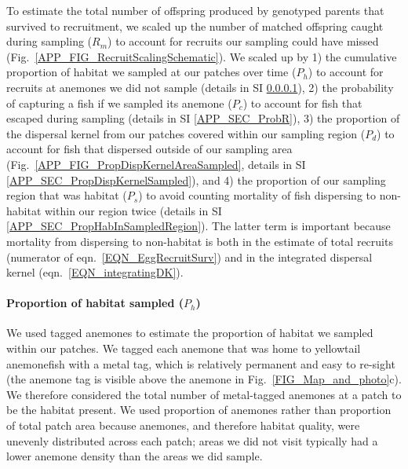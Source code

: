 \documentclass[12pt, oneside]{article}   	%
\begin{document}
To estimate the total number of offspring produced by genotyped parents that survived to recruitment, we scaled up the number of matched offspring caught during sampling ($R_m$) to account for recruits our sampling could have missed (Fig.\ \ref{APP_FIG_RecruitScalingSchematic}). We scaled up by 1) the cumulative proportion of habitat we sampled at our patches over time ($P_h$) to account for recruits at anemones we did not sample (details in SI \ref{APP_SEC_ProbHabSampled}), 2) the probability of capturing a fish if we sampled its anemone ($P_c$) to account for fish that escaped during sampling (details in SI \ref{APP_SEC_ProbR}), 3) the proportion of the dispersal kernel from our patches covered within our sampling region ($P_d$) to account for fish that dispersed outside of our sampling area (Fig.\ \ref{APP_FIG_PropDispKernelAreaSampled}, details in SI \ref{APP_SEC_PropDispKernelSampled}), and 4) the proportion of our sampling region that was habitat ($P_s$) to avoid counting mortality of fish dispersing to non-habitat within our region twice (details in SI \ref{APP_SEC_PropHabInSampledRegion}). The latter term is important because mortality from dispersing to non-habitat is both in the estimate of total recruits (numerator of eqn.\ \ref{EQN_EggRecruitSurv}) and in the integrated dispersal kernel (eqn.\ \ref{EQN_integratingDK}). %

\paragraph{Proportion of habitat sampled ($P_h$)} \label{APP_SEC_ProbHabSampled}

We used tagged anemones to estimate the proportion of habitat we sampled within our patches. We tagged each anemone that was home to yellowtail anemonefish with a metal tag, which is relatively permanent and easy to re-sight (the anemone tag is visible above the anemone in Fig.\ \ref{FIG_Map_and_photo}c). We therefore considered the total number of metal-tagged anemones at a patch to be the habitat present. We used proportion of anemones rather than proportion of total patch area because anemones, and therefore habitat quality, were unevenly distributed across each patch; areas we did not visit typically had a lower anemone density than the areas we did sample. %
\end{document}
